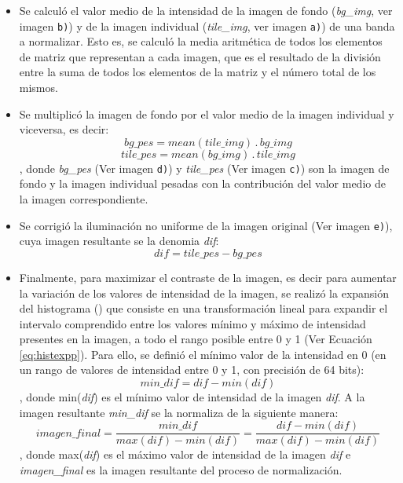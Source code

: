 \begin{itemize}
\justifying
\item Se calculó el valor medio de la intensidad de la imagen de fondo (\textit{bg\_img}, ver imagen \texttt{b)}) y de la imagen individual (\textit{tile\_img}, ver imagen \texttt{a)}) de una banda a normalizar. Esto es, se calculó la media aritmética de todos los elementos de matriz que representan a cada imagen, que es el resultado de la división entre la suma de todos los elementos de la matriz y el número total de los mismos.
\item Se multiplicó la imagen de fondo por el valor medio de la imagen individual y viceversa, es decir:
\begin{equation}
\textit{bg\_pes} = mean(\textit{tile\_img})\hspace{2pt} . \hspace{2pt}\textit{bg\_img}
\end{equation}
\begin{equation}
\textit{tile\_pes} = mean(\textit{bg\_img})\hspace{2pt} . \hspace{2pt}\textit{tile\_img}
\end{equation},
donde \textit{bg\_pes} (Ver imagen \texttt{d)}) y \textit{tile\_pes} (Ver imagen \texttt{c)}) son la imagen de fondo y la imagen individual pesadas con la contribución del valor medio de la imagen correspondiente.
\item Se corrigió la iluminación no uniforme de la imagen original (Ver imagen \texttt{e)}), cuya imagen resultante se la denomia \textit{dif}:
\begin{equation}
\textit{dif} = \textit{tile\_pes} - \textit{bg\_pes}
\end{equation}
\item Finalmente, para maximizar el contraste de la imagen, es decir para aumentar la variación de los valores de intensidad de la imagen, se realizó la expansión del histograma (\cite{anilfund}) que consiste en una transformación lineal para expandir el intervalo comprendido entre los valores mínimo y máximo de intensidad presentes en la imagen, a todo el rango posible entre 0 y 1 (Ver Ecuación \ref{eq:histexpp}). Para ello, se definió el mínimo valor de la intensidad en 0 (en un rango de valores de intensidad entre 0 y 1, con precisión de 64 bits):
\begin{equation}
	\textit{min\_dif} = \textit{dif} - min(\textit{dif})
\end{equation},
donde min(\textit{dif}) es el mínimo valor de intensidad de la imagen \textit{dif}. A la imagen resultante \textit{min\_dif} se la normaliza de la siguiente manera:
\begin{equation}
	\textit{imagen\_final} = \frac{\textit{min\_dif}}{max(\textit{dif})-min(\textit{dif})} = \frac{\textit{dif} - min(\textit{dif})}{max(\textit{dif})-min(\textit{dif})}
	\label{eq:histexpp}
\end{equation},
donde max(\textit{dif}) es el máximo valor de intensidad de la imagen \textit{dif} e \textit{imagen\_final} es la imagen resultante del proceso de normalización.
\end{itemize}

